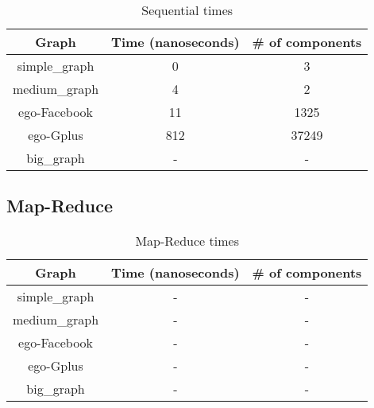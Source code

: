 \begin{table}[h!]
\footnotesize
\begin{center}
\begin{tabular}{|c|c|c|}
\hline
{\bf Graph} & {\bf Time (nanoseconds)}& {\bf \# of components} \\
\hline
\hline
simple\_graph   & 0  & 3  \\
\hline
medium\_graph   & 4  & 2   \\
\hline
ego-Facebook   & 11  & 1325  \\
\hline
ego-Gplus   & 812 & 37249 \\
\hline
big\_graph   & -  & -  \\
\hline
\end{tabular}
\caption{Sequential times}
\label{tb:sequentialtimes}
\end{center}
\end{table}

\subsection{Map-Reduce}

\begin{table}[h!]
\footnotesize
\begin{center}
\begin{tabular}{|c|c|c|}
\hline
{\bf Graph} & {\bf Time (nanoseconds)}& {\bf \# of components} \\
\hline
\hline
simple\_graph   & -  & -  \\
\hline
medium\_graph   & -  & -   \\
\hline
ego-Facebook   & -  & -  \\
\hline
ego-Gplus   & -  & -\\
\hline
big\_graph   & -  & -  \\
\hline
\end{tabular}
\caption{Map-Reduce times}
\label{tb:MapReducetimes}
\end{center}
\end{table}
